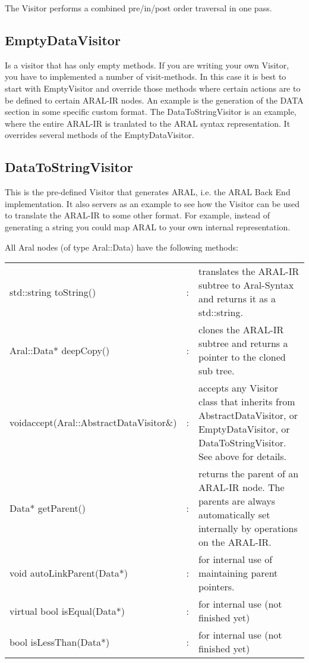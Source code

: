The Visitor performs a combined pre/in/post order traversal in one pass.

\subsection{EmptyDataVisitor}
Is a visitor that has only empty methods. If you are writing your own
Visitor, you have to implemented a number of visit-methods. In this
case it is best to start with EmptyVisitor and override those methods
where certain actions are to be defined to certain ARAL-IR nodes. An example is the
generation of the DATA section in some specific custom format. The DataToStringVisitor
is an example, where the entire ARAL-IR is tranlated to the ARAL syntax representation. It overrides
several methods of the EmptyDataVisitor.

\subsection{DataToStringVisitor}
This is the pre-defined Visitor that generates ARAL, i.e. the ARAL
Back End implementation. It also servers as an example to see how the
Visitor can be used to translate the ARAL-IR to some other format. For
example, instead of generating a string you could map ARAL to your own
internal representation.

All Aral nodes (of type Aral::Data) have the following methods:

\begin{tabular}{p{6cm}cp{7.2cm}}
std::string toString()& :& translates the ARAL-IR subtree to Aral-Syntax and
                         returns it as a std::string.\\

Aral::Data* deepCopy()& : &clones the ARAL-IR subtree and returns a
                         pointer to the cloned sub tree.\\
void\newline accept(Aral::AbstractDataVisitor\&)& :& accepts any Visitor class that inherits
                         from AbstractDataVisitor, or EmptyDataVisitor, 
                         or DataToStringVisitor. See above for details.\\
Data* getParent()   &  :& returns the parent of an ARAL-IR node. The parents are always
                         automatically set internally by operations on the ARAL-IR.\\

void autoLinkParent(Data*)& : &for internal use of maintaining parent pointers.\\
virtual bool isEqual(Data*)&: &for internal use (not finished yet)\\
bool isLessThan(Data*)     &:& for internal use (not finished yet)\\
\end{tabular}

